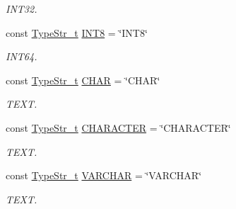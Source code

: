 \begin{DoxyCompactItemize}
\begin{DoxyCompactList}\small\item\em I\+N\+T32. \end{DoxyCompactList}\item 
\mbox{\label{namespacesf_1_1sql__types_a37d20d6816136a66e052adb437c9cd9c}} 
const \hyperlink{namespacesf_1_1sql__types_a1a4f114cdf79706d2298e3454006e65b}{Type\+Str\+\_\+t} \hyperlink{namespacesf_1_1sql__types_a37d20d6816136a66e052adb437c9cd9c}{I\+N\+T8} = \char`\"{}I\+N\+T8\char`\"{}
\begin{DoxyCompactList}\small\item\em I\+N\+T64. \end{DoxyCompactList}\item 
\mbox{\label{namespacesf_1_1sql__types_aeccb91cac2a5a4c9053b7a05a1835d9d}} 
const \hyperlink{namespacesf_1_1sql__types_a1a4f114cdf79706d2298e3454006e65b}{Type\+Str\+\_\+t} \hyperlink{namespacesf_1_1sql__types_aeccb91cac2a5a4c9053b7a05a1835d9d}{C\+H\+AR} = \char`\"{}C\+H\+AR\char`\"{}
\begin{DoxyCompactList}\small\item\em T\+E\+XT. \end{DoxyCompactList}\item 
\mbox{\label{namespacesf_1_1sql__types_abfa2105dba94d6f9d68be6acf362e0ef}} 
const \hyperlink{namespacesf_1_1sql__types_a1a4f114cdf79706d2298e3454006e65b}{Type\+Str\+\_\+t} \hyperlink{namespacesf_1_1sql__types_abfa2105dba94d6f9d68be6acf362e0ef}{C\+H\+A\+R\+A\+C\+T\+ER} = \char`\"{}C\+H\+A\+R\+A\+C\+T\+ER\char`\"{}
\begin{DoxyCompactList}\small\item\em T\+E\+XT. \end{DoxyCompactList}\item 
\mbox{\label{namespacesf_1_1sql__types_ae7a983432f92ac7b0d26ceb429ed5e1a}} 
const \hyperlink{namespacesf_1_1sql__types_a1a4f114cdf79706d2298e3454006e65b}{Type\+Str\+\_\+t} \hyperlink{namespacesf_1_1sql__types_ae7a983432f92ac7b0d26ceb429ed5e1a}{V\+A\+R\+C\+H\+AR} = \char`\"{}V\+A\+R\+C\+H\+AR\char`\"{}
\begin{DoxyCompactList}\small\item\em T\+E\+XT. \end{DoxyCompactList}\item 

\end{DoxyCompactItemize}
